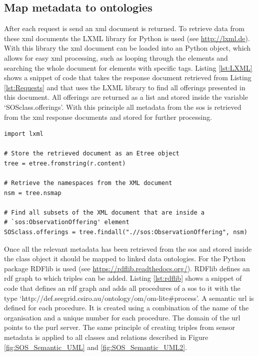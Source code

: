 \subsection{Map metadata to ontologies}
After each request is send an \ac{xml} document is returned. To retrieve data from these \ac{xml} documents the LXML library for Python is used (see \url{http://lxml.de}). With this library the \ac{xml} document can be loaded into an Python object, which allows for easy \ac{xml} processing, such as looping through the elements and searching the whole document for elements with specific tags. Listing \ref{lst:LXML} shows a snippet of code that takes the response document retrieved from Listing \ref{lst:Requests} and that uses the LXML library to find all offerings presented in this document. All offerings are returned as a list and stored inside the variable `SOSclass.offerings'. With this principle all metadata from the \ac{sos} is retrieved from the \ac{xml} response documents and stored for further processing.    

\begin{lstlisting}[float,caption={Creating an Etree object from an XML response document using Python's LXML library}, label={lst:LXML}]
import lxml

# Store the retrieved document as an Etree object
tree = etree.fromstring(r.content)

# Retrieve the namespaces from the XML document
nsm = tree.nsmap

# Find all subsets of the XML document that are inside a   
# `sos:ObservationOffering' element 
SOSclass.offerings = tree.findall(".//sos:ObservationOffering", nsm)

\end{lstlisting}   

Once all the relevant metadata has been retrieved from the \ac{sos} and stored inside the class object it should be mapped to linked data ontologies. For the Python package RDFlib is used (see \url{https://rdflib.readthedocs.org/}).  RDFlib defines an \ac{rdf} graph to which triples can be added. Listing \ref{lst:rdflib} shows a snippet of code that defines an \ac{rdf} graph and adds all procedures of a \ac{sos} to it with the type `http://def.seegrid.csiro.au/ontology/om/om-lite\#process'. A semantic \ac{url} is defined for each procedure. It is created using a combination of the name of the organisation and a unique number for each procedure. The domain of the \ac{url} points to the \ac{purl} server. The same principle of creating triples from sensor metadata is applied to all classes and relations described in Figure \ref{fig:SOS_Semantic_UML} and \ref{fig:SOS_Semantic_UML2}. 


